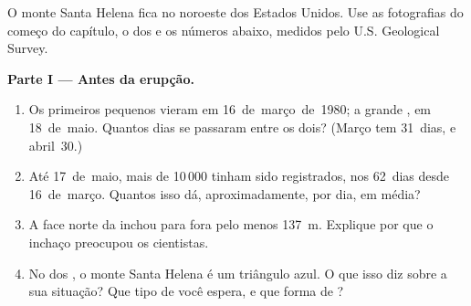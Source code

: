 \begin{problem}
\label{pb:g7:volcanoes:1}

O monte Santa Helena fica no noroeste dos Estados Unidos. Use as
fotografias do começo do capítulo, o  dos  e os números abaixo,
medidos pelo U.S. Geological Survey.

\medskip
\noindent\textbf{Parte I --- Antes da erupção.}
\begin{enumerate}
  \item Os primeiros pequenos  vieram em 16~de~março~de~1980; a
        grande , em 18~de~maio. Quantos dias se passaram entre os
        dois? (Março tem 31~dias, e abril~30.)
  \item Até 17~de~maio, mais de 10\,000  tinham sido
        registrados, nos 62~dias desde 16~de~março. Quantos isso dá,
        aproximadamente, por dia, em média?
  \item A face norte da  inchou para fora pelo menos
        \qty{137}{m}. Explique por que o inchaço preocupou os cientistas.
  \item No  dos , o monte Santa Helena é um triângulo azul. O
        que isso diz sobre a sua situação? Que tipo de  você espera,
        e que forma de ?
\end{enumerate}


\end{problem}
